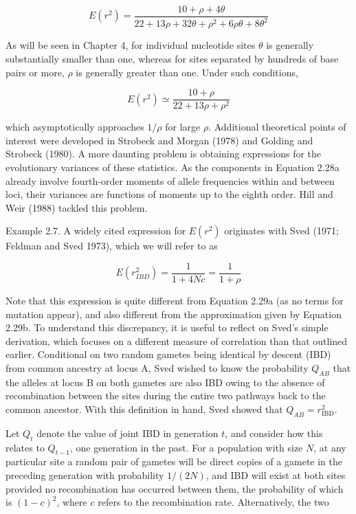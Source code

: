 \documentclass{article}
\begin{document}
\begin{equation}
E(r^{2})=\frac{10+\rho+4\theta}{22+13\rho+32\theta+\rho^{2}+6\rho\theta+8\theta^{2}}
\tag{2.29a}
\label{eq:2_29a}
\end{equation}

As will be seen in Chapter 4, for individual nucleotide sites  $ \theta $ is generally substantially smaller than one, whereas for sites separated by hundreds of base pairs or more,  $ \rho $ is generally greater than one. Under such conditions,

\begin{equation}
E(r^{2})\simeq\frac{10+\rho}{22+13\rho+\rho^{2}}
\tag{2.29b}
\label{eq:2_29b}
\end{equation}

which asymptotically approaches  $ 1/\rho $ for large  $ \rho $. Additional theoretical points of interest were developed in Strobeck and Morgan (1978) and Golding and Strobeck (1980). A more daunting problem is obtaining expressions for the evolutionary variances of these statistics. As the components in Equation 2.28a already involve fourth-order moments of allele frequencies within and between loci, their variances are functions of moments up to the eighth order. Hill and Weir (1988) tackled this problem.

Example 2.7. A widely cited expression for  $ E(r^{2}) $ originates with Sved (1971; Feldman and Sved 1973), which we will refer to as

\begin{equation}
E(r_{IBD}^{2})=\frac{1}{1+4Nc}=\frac{1}{1+\rho}
\end{equation}

Note that this expression is quite different from Equation 2.29a (as no terms for mutation appear), and also different from the approximation given by Equation 2.29b. To understand this discrepancy, it is useful to reflect on Sved's simple derivation, which focuses on a different measure of correlation than that outlined earlier. Conditional on two random gametes being identical by descent (IBD) from common ancestry at locus A, Sved wished to know the probability  $ Q_{AB} $ that the alleles at locus B on both gametes are also IBD owing to the absence of recombination between the sites during the entire two pathways back to the common ancestor. With this definition in hand, Sved showed that  $ Q_{AB} = r_{\mathrm{IBD}}^{2} $.

Let $Q_t$ denote the value of joint IBD in generation $t$, and consider how this relates to $Q_{t-1}$, one generation in the past. For a population with size $N$, at any particular site a random pair of gametes will be direct copies of a gamete in the preceding generation with probability $1/(2N)$, and IBD will exist at both sites provided no recombination has occurred between them, the probability of which is $(1-c)^2$, where $c$ refers to the recombination rate. Alternatively, the two
\end{document}
